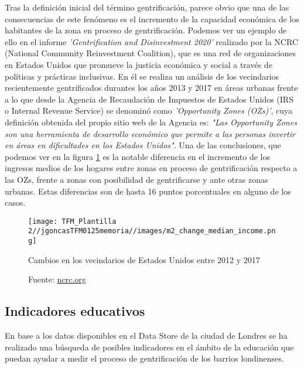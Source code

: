 \documentclass[12pt,a4paper,twoside]{book}
\begin{document}
Tras la definición inicial del término gentrificación, parece obvio que una de las consecuencias de este fenómeno es el incremento de la capacidad económica de los habitantes de la zona en proceso de gentrificación. Podemos ver un ejemplo de ello en el informe \textit{'Gentrification and Disinvestment 2020'} \cite{richardson_gentrification_2020} realizado por la NCRC (National Community Reinvestment Coalition), que es una red de organizaciones en Estados Unidos que promueve la justicia económica y social a través de políticas y prácticas inclusivas. En él se realiza un análisis de los vecindarios recientemente gentrificados durantes los años 2013 y 2017 en áreas urbanas frente a lo que desde la Agencia de Recaudación de Impuestos de Estados Unidos (IRS o Internal Revenue Service) se denominó como \textit{'Opportunity Zones (OZs)'}, cuya definición obtenida del propio sitio web de la Agencia \cite{irs_opportunity_2024} es: \textit{"Las Opportunity Zones son una herramienta de desarrollo económico que permite a las personas invertir en áreas en dificultades en los Estados Unidos"}. Una de las conclusiones, que podemos ver en la figura \ref{fig:fig_change_median_income} es la notable diferencia en el incremento de los ingresos medios de los hogares entre zonas en proceso de gentrificación respecto a las OZs, frente a zonas con posibilidad de gentrificarse y ante otras zonas urbanas. Estas diferencias son de hasta 16 puntos porcentuales en alguno de los casos.

\begin{figure}
    \centering
    \texttt{[image: TFM\_Plantilla 2//jgoncasTFM0125memoria//images/m2\_change\_median\_income.png]}
    \caption{Cambios en los vecindarios de Estados Unidos entre 2012 y 2017}
    \caption*{Fuente: \href{https://ncrc.org/gentrification20/}{ncrc.org}}
    \label{fig:fig_change_median_income}
\end{figure}

\subsection{Indicadores educativos}

En base a los datos disponibles en el Data Store de la ciudad de Londres \cite{greater_london_authority_dataset_nodate} se ha realizado una búsqueda de posibles indicadores en el ámbito de la educación que puedan ayudar a medir el proceso de gentrificación de los barrios londinenses.
\end{document}
